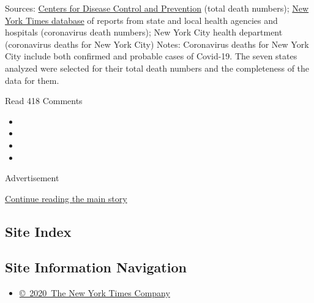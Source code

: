 Sources: \href{https://www.cdc.gov/nchs/nvss/vsrr/covid_weekly/}{Centers
for Disease Control and
P}\href{https://www.cdc.gov/nchs/nvss/vsrr/covid_weekly/}{revention}
(total death numbers);
\href{https://www.nytimes3xbfgragh.onion/interactive/2020/us/coronavirus-us-cases.html}{New
York Times database} of reports from state and local health agencies and
hospitals (coronavirus death numbers); New York City health department
(coronavirus deaths for New York City) \textbar{} Notes: Coronavirus
deaths for New York City include both confirmed and probable cases of
Covid-19. The seven states analyzed were selected for their total death
numbers and the completeness of the data for them.

Read 418 Comments

\begin{itemize}
\item
\item
\item
\item
\end{itemize}

Advertisement

\protect\hyperlink{after-bottom}{Continue reading the main story}

\hypertarget{site-index}{%
\subsection{Site Index}\label{site-index}}

\hypertarget{site-information-navigation}{%
\subsection{Site Information
Navigation}\label{site-information-navigation}}

\begin{itemize}
\tightlist
\item
  \href{https://help.nytimes3xbfgragh.onion/hc/en-us/articles/115014792127-Copyright-notice}{©~2020~The
  New York Times Company}
\end{itemize}

